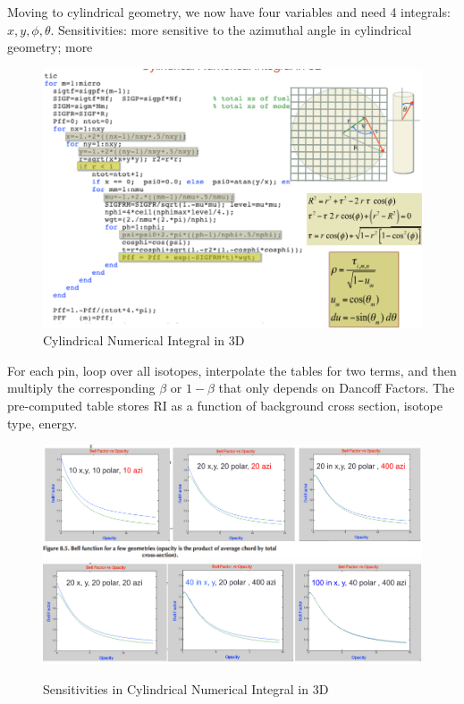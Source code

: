 \documentclass{school-22.211-notes}
\begin{document}
\clearpage
{}
Moving to cylindrical geometry, we now have four variables and need 4 integrals: $x,y, \phi, \theta$. Sensitivities: more sensitive to the azimuthal angle in cylindrical geometry; more 
\begin{figure}[h]
  \centering
  \includegraphics[width=6in]{images/pin/cylinder-ni-1.png}
  \caption{Cylindrical Numerical Integral in 3D} 
\end{figure}

For each pin, loop over all isotopes, interpolate the tables for two terms, and then multiply the corresponding $\beta$ or $1-\beta$ that only depends on Dancoff Factors. The pre-computed table stores RI as a function of background cross section, isotope type, energy. 

\begin{figure}[h]
  \centering
  \includegraphics[width=5in]{images/pin/cylinder-ni-2.png}
  \includegraphics[width=5in]{images/pin/cylinder-ni-3.png}
  \caption{Sensitivities in Cylindrical Numerical Integral in 3D} 
\end{figure}
\end{document}
